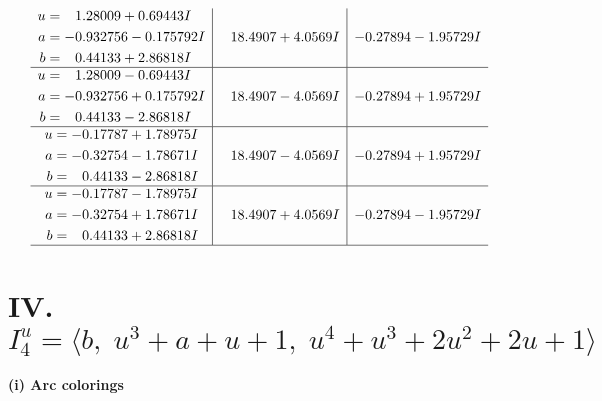 \documentclass[1p]{elsarticle_modified}
\theoremstyle{definition}
\begin{document}
$$\begin{array}{c|c|c}
\begin{aligned}
u &= \phantom{-}1.28009 + 0.69443 I \\
a &= -0.932756 - 0.175792 I \\
b &= \phantom{-}0.44133 + 2.86818 I\end{aligned}
 & \phantom{-}18.4907 + 4.0569 I & -0.27894 - 1.95729 I \\ \hline\begin{aligned}
u &= \phantom{-}1.28009 - 0.69443 I \\
a &= -0.932756 + 0.175792 I \\
b &= \phantom{-}0.44133 - 2.86818 I\end{aligned}
 & \phantom{-}18.4907 - 4.0569 I & -0.27894 + 1.95729 I \\ \hline\begin{aligned}
u &= -0.17787 + 1.78975 I \\
a &= -0.32754 - 1.78671 I \\
b &= \phantom{-}0.44133 - 2.86818 I\end{aligned}
 & \phantom{-}18.4907 - 4.0569 I & -0.27894 + 1.95729 I \\ \hline\begin{aligned}
u &= -0.17787 - 1.78975 I \\
a &= -0.32754 + 1.78671 I \\
b &= \phantom{-}0.44133 + 2.86818 I\end{aligned}
 & \phantom{-}18.4907 + 4.0569 I & -0.27894 - 1.95729 I\\
 \hline 
 \end{array}$$\newpage\newpage\renewcommand{\arraystretch}{1}
\centering \section*{IV. $I^u_{4}= \langle b,\;u^3+a+u+1,\;u^4+u^3+2 u^2+2 u+1 \rangle$}
\flushleft \textbf{(i) Arc colorings}\\
\end{document}
